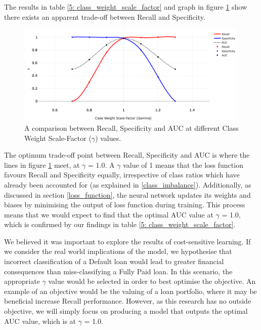         The results in table \ref{5: class_weight_scale_factor} and graph in figure \ref{gamma_comparison} show there exists an apparent trade-off between Recall and Specificity. 
        
        \begin{figure}[H]
            \centering
            \includegraphics[width=0.99\textwidth]{Images/cost_sens_learn.png}
            \caption{A comparison between Recall, Specificity and AUC at different Class Weight Scale-Factor ($\gamma$) values.}
            \label{gamma_comparison}
        \end{figure}
        
        
        The optimum trade-off point between Recall, Specificity and AUC is where the lines in figure \ref{gamma_comparison} meet, at $\gamma$ = 1.0. A $\gamma$ value of 1 means that the loss function favours Recall and Specificity equally, irrespective of class ratios which have already been accounted for (as explained in \ref{class_imbalance}). Additionally, as discussed in section \ref{loss_function}, the neural network updates its weights and biases by minimising the output of loss function during training. This process means that we would expect to find that the optimal AUC value at $\gamma$ = 1.0, which is confirmed by our findings in table \ref{5: class_weight_scale_factor}. 
        
        We believed it was important to explore the results of cost-sensitive learning. If we consider the real world implications of the model, we hypothesise that incorrect classification of a Default loan would lead to greater financial consequences than miss-classifying a Fully Paid loan. In this scenario, the appropriate $\gamma$ value would be selected in order to best optimise the objective. An example of an objective would be the valuing of a loan portfolio, where it may be beneficial increase Recall performance. However, as this research has no outside objective, we will simply focus on producing a model that outputs the optimal AUC value, which is at $\gamma$ = 1.0. 

